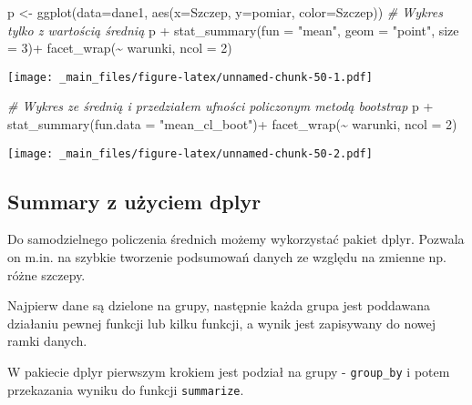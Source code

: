 \documentclass[
]{book}
\newenvironment{Shaded}{\begin{snugshade}}{\end{snugshade}}
\newcommand{\AttributeTok}[1]{\textcolor[rgb]{0.77,0.63,0.00}{#1}}
\newcommand{\CommentTok}[1]{\textcolor[rgb]{0.56,0.35,0.01}{\textit{#1}}}
\newcommand{\DecValTok}[1]{\textcolor[rgb]{0.00,0.00,0.81}{#1}}
\newcommand{\FunctionTok}[1]{\textcolor[rgb]{0.00,0.00,0.00}{#1}}
\newcommand{\NormalTok}[1]{#1}
\newcommand{\OtherTok}[1]{\textcolor[rgb]{0.56,0.35,0.01}{#1}}
\newcommand{\SpecialCharTok}[1]{\textcolor[rgb]{0.00,0.00,0.00}{#1}}
\newcommand{\StringTok}[1]{\textcolor[rgb]{0.31,0.60,0.02}{#1}}
\begin{document}
\begin{Shaded}
\begin{Highlighting}[]
\NormalTok{p }\OtherTok{\textless{}{-}} \FunctionTok{ggplot}\NormalTok{(}\AttributeTok{data=}\NormalTok{dane1, }\FunctionTok{aes}\NormalTok{(}\AttributeTok{x=}\NormalTok{Szczep, }\AttributeTok{y=}\NormalTok{pomiar, }\AttributeTok{color=}\NormalTok{Szczep))}
\CommentTok{\# Wykres tylko z wartością średnią}
\NormalTok{p }\SpecialCharTok{+} \FunctionTok{stat\_summary}\NormalTok{(}\AttributeTok{fun =} \StringTok{"mean"}\NormalTok{, }\AttributeTok{geom =} \StringTok{"point"}\NormalTok{, }\AttributeTok{size =} \DecValTok{3}\NormalTok{)}\SpecialCharTok{+}
  \FunctionTok{facet\_wrap}\NormalTok{(}\SpecialCharTok{\textasciitilde{}}\NormalTok{ warunki, }\AttributeTok{ncol =} \DecValTok{2}\NormalTok{)}
\end{Highlighting}
\end{Shaded}

\texttt{[image: \_main\_files/figure-latex/unnamed-chunk-50-1.pdf]}

\begin{Shaded}
\begin{Highlighting}[]
\CommentTok{\# Wykres ze średnią i przedziałem ufności policzonym metodą bootstrap}
\NormalTok{p }\SpecialCharTok{+} \FunctionTok{stat\_summary}\NormalTok{(}\AttributeTok{fun.data =} \StringTok{"mean\_cl\_boot"}\NormalTok{)}\SpecialCharTok{+}
  \FunctionTok{facet\_wrap}\NormalTok{(}\SpecialCharTok{\textasciitilde{}}\NormalTok{ warunki, }\AttributeTok{ncol =} \DecValTok{2}\NormalTok{)}
\end{Highlighting}
\end{Shaded}

\texttt{[image: \_main\_files/figure-latex/unnamed-chunk-50-2.pdf]}

\hypertarget{summary-z-uux17cyciem-dplyr}{%
\subsection{Summary z użyciem dplyr}\label{summary-z-uux17cyciem-dplyr}}

Do samodzielnego policzenia średnich możemy wykorzystać pakiet dplyr. Pozwala on m.in. na szybkie tworzenie podsumowań danych ze względu na zmienne np. różne szczepy.

Najpierw dane są dzielone na grupy, następnie każda grupa jest poddawana działaniu pewnej funkcji lub kilku funkcji, a wynik jest zapisywany do nowej ramki danych.

W pakiecie dplyr pierwszym krokiem jest podział na grupy - \texttt{group\_by} i potem przekazania wyniku do funkcji \texttt{summarize}.
\end{document}
